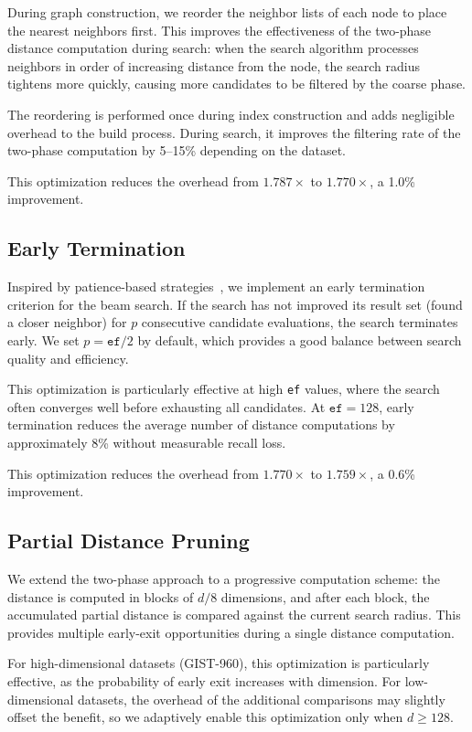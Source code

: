 \documentclass[10pt,journal,compsoc]{IEEEtran}
\begin{document}
During graph construction, we reorder the neighbor lists of each node to place the nearest neighbors first. This improves the effectiveness of the two-phase distance computation during search: when the search algorithm processes neighbors in order of increasing distance from the node, the search radius tightens more quickly, causing more candidates to be filtered by the coarse phase.

The reordering is performed once during index construction and adds negligible overhead to the build process. During search, it improves the filtering rate of the two-phase computation by 5--15\% depending on the dataset.

This optimization reduces the overhead from $1.787\times$ to $1.770\times$, a 1.0\% improvement.

\subsection{Early Termination}

Inspired by patience-based strategies~\cite{teofili2025patience}, we implement an early termination criterion for the beam search. If the search has not improved its result set (found a closer neighbor) for $p$ consecutive candidate evaluations, the search terminates early. We set $p = \texttt{ef} / 2$ by default, which provides a good balance between search quality and efficiency.

This optimization is particularly effective at high \texttt{ef} values, where the search often converges well before exhausting all candidates. At $\texttt{ef} = 128$, early termination reduces the average number of distance computations by approximately 8\% without measurable recall loss.

This optimization reduces the overhead from $1.770\times$ to $1.759\times$, a 0.6\% improvement.

\subsection{Partial Distance Pruning}

We extend the two-phase approach to a progressive computation scheme: the distance is computed in blocks of $d/8$ dimensions, and after each block, the accumulated partial distance is compared against the current search radius. This provides multiple early-exit opportunities during a single distance computation.

For high-dimensional datasets (GIST-960), this optimization is particularly effective, as the probability of early exit increases with dimension. For low-dimensional datasets, the overhead of the additional comparisons may slightly offset the benefit, so we adaptively enable this optimization only when $d \geq 128$.
\end{document}

